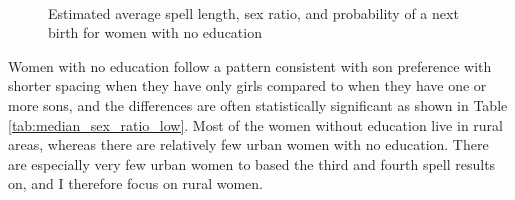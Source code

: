 \documentclass[12pt,letterpaper]{article}
\begin{document}
\captionsetup[subfigure]{captionskip=-1pt,farskip=-0.5pt}


\begin{figure}[htpb]
\centering
{}
\\
\caption{Estimated average spell length, sex ratio, and probability of 
a next birth for women with no education}
\label{fig:bootstrap_low}
\end{figure}




Women with no education follow a pattern consistent with son
preference with shorter spacing when they have only girls compared 
to when they have one or more sons, and the differences are often 
statistically significant as shown in Table \ref{tab:median_sex_ratio_low}.
Most of the women without education live in rural areas,
whereas there are relatively few urban women with no education.
There are especially very few urban women to based the third
and fourth spell results on, and I therefore focus on rural women.
\end{document}
